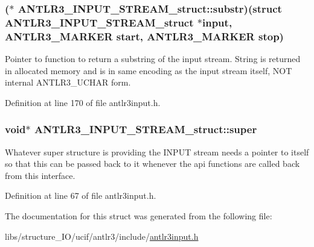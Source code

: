 \hypertarget{struct_a_n_t_l_r3___i_n_p_u_t___s_t_r_e_a_m__struct_aa5328318fdaba5a203bd15a7136b8594}{
\subsubsection[{substr}]{($\ast$ A\-N\-T\-L\-R3\-\_\-\-I\-N\-P\-U\-T\-\_\-\-S\-T\-R\-E\-A\-M\-\_\-struct\-::substr)(struct {\bf A\-N\-T\-L\-R3\-\_\-\-I\-N\-P\-U\-T\-\_\-\-S\-T\-R\-E\-A\-M\-\_\-struct} $\ast$input, {\bf A\-N\-T\-L\-R3\-\_\-\-M\-A\-R\-K\-E\-R} start, {\bf A\-N\-T\-L\-R3\-\_\-\-M\-A\-R\-K\-E\-R} stop)}}\label{struct_a_n_t_l_r3___i_n_p_u_t___s_t_r_e_a_m__struct_aa5328318fdaba5a203bd15a7136b8594}
Pointer to function to return a substring of the input stream. String is returned in allocated memory and is in same encoding as the input stream itself, N\-O\-T internal A\-N\-T\-L\-R3\-\_\-\-U\-C\-H\-A\-R form. 

Definition at line 170 of file antlr3input.\-h.

\hypertarget{struct_a_n_t_l_r3___i_n_p_u_t___s_t_r_e_a_m__struct_a36f0bf6696f00e7b09745269c8c705d8}{
\subsubsection[{super}]{\setlength{\rightskip}{0pt plus 5cm}void$\ast$ A\-N\-T\-L\-R3\-\_\-\-I\-N\-P\-U\-T\-\_\-\-S\-T\-R\-E\-A\-M\-\_\-struct\-::super}}\label{struct_a_n_t_l_r3___i_n_p_u_t___s_t_r_e_a_m__struct_a36f0bf6696f00e7b09745269c8c705d8}
Whatever super structure is providing the I\-N\-P\-U\-T stream needs a pointer to itself so that this can be passed back to it whenever the api functions are called back from this interface. 

Definition at line 67 of file antlr3input.\-h.



The documentation for this struct was generated from the following file\-:\begin{DoxyCompactItemize}
\item 
libs/structure\-\_\-\-I\-O/ucif/antlr3/include/\hyperlink{antlr3input_8h}{antlr3input.\-h}\end{DoxyCompactItemize}
